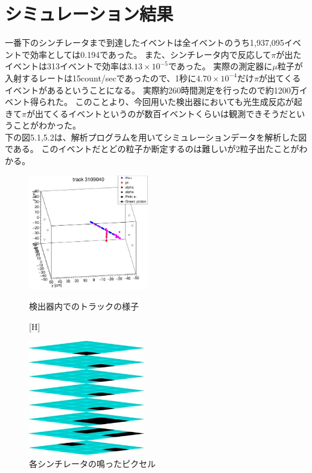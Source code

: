 \section{シミュレーション結果}
一番下のシンチレータまで到達したイベントは全イベントのうち1,937,095イベントで効率としては0.194であった。
また、シンチレータ内で反応して$\pi$が出たイベントは313イベントで効率は$3.13 \times10^{-5}$であった。
実際の測定器に$\mu$粒子が入射するレートは15count/secであったので、1秒に$4.70 \times10^{-4}$だけ$\pi$が出てくるイベントがあるということになる。
実際約260時間測定を行ったので約1200万イベント得られた。
このことより、今回用いた検出器においても光生成反応が起きて$\pi$が出てくるイベントというのが数百イベントくらいは観測できそうだということがわかった。
\\
下の図5.1,5.2は、解析プログラムを用いてシミュレーションデータを解析した図である。
このイベントだとどの粒子か断定するのは難しいが2粒子出たことがわかる。
\begin{figure}[H]
    \begin{minipage}[b]{0.47\linewidth}
        \centering
        \includegraphics[height=5cm]{img/track_pion.jpg}
        \caption{検出器内でのトラックの様子}
    \end{minipage}[H]
    \begin{minipage}[b]{0.47\linewidth}
        \centering
        \includegraphics[height=5cm]{img/track_simulation.jpg}
        \caption{各シンチレータの鳴ったピクセル}
    \end{minipage}
\end{figure}
        
